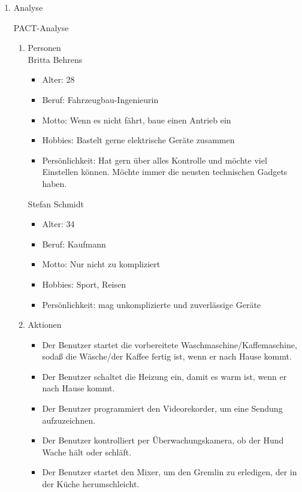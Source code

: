 \documentclass[a4paper,10pt]{article}
\begin{document}
\kopf
\renewcommand{\figurename}{Figure}

\begin{enumerate}
\item Analyse

PACT-Analyse

\begin{enumerate}
\item Personen\\
Britta Behrens
\begin{itemize}
\item Alter: 28
\item Beruf: Fahrzeugbau-Ingenieurin
\item Motto: Wenn es nicht fährt, baue einen Antrieb ein
\item Hobbies: Bastelt gerne elektrische Geräte zusammen
\item Persönlichkeit: Hat gern über alles Kontrolle und möchte viel Einstellen können. Möchte immer die neusten technischen Gadgets haben.
\end{itemize}

Stefan Schmidt
\begin{itemize}
\item Alter: 34
\item Beruf: Kaufmann
\item Motto: Nur nicht zu kompliziert
\item Hobbies: Sport, Reisen
\item Persönlichkeit: mag unkomplizierte und zuverlässige Geräte
\end{itemize}

\item Aktionen

\begin{itemize}
\item Der Benutzer startet die vorbereitete Waschmaschine/Kaffemaschine, sodaß die Wäsche/der Kaffee fertig ist, wenn er nach Hause kommt.
\item Der Benutzer schaltet die Heizung ein, damit es warm ist, wenn er nach Hause kommt.
\item Der Benutzer programmiert den Videorekorder, um eine Sendung aufzuzeichnen.
\item Der Benutzer kontrolliert per Überwachungskamera, ob der Hund Wache hält oder schläft.
\item Der Benutzer startet den Mixer, um den Gremlin zu erledigen, der in der Küche herumschleicht.
\end{itemize}


\end{enumerate}
\end{enumerate}
\end{document}
